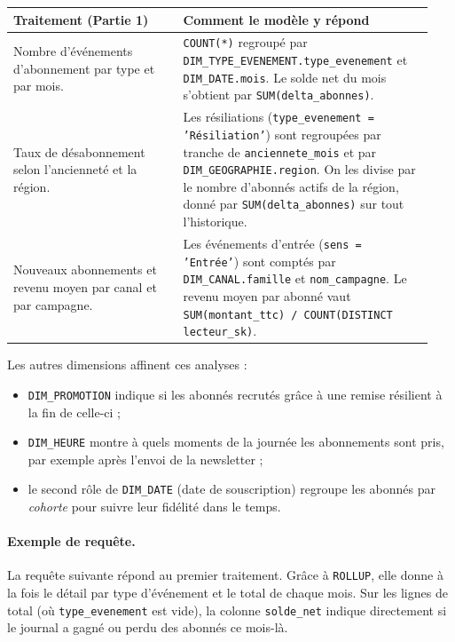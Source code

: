\documentclass[a4paper,12pt]{article}
\begin{document}
\begin{center}
\renewcommand{\arraystretch}{1.3}
\begin{tabular}{@{}p{0.38\linewidth}p{0.56\linewidth}@{}}
  \toprule
  \textbf{Traitement (Partie 1)} & \textbf{Comment le modèle y répond} \\
  \midrule
  Nombre d'événements d'abonnement par type et par mois.
    & \texttt{COUNT(*)} regroupé par \texttt{DIM\_TYPE\_EVENEMENT.type\_evenement}
      et \texttt{DIM\_DATE.mois}. Le solde net du mois s'obtient par
      \texttt{SUM(delta\_abonnes)}. \\
  \addlinespace
  Taux de désabonnement selon l'ancienneté et la région.
    & Les résiliations (\texttt{type\_evenement = 'Résiliation'}) sont
      regroupées par tranche de \texttt{anciennete\_mois} et par
      \texttt{DIM\_GEOGRAPHIE.region}. On les divise par le nombre d'abonnés
      actifs de la région, donné par \texttt{SUM(delta\_abonnes)} sur tout
      l'historique. \\
  \addlinespace
  Nouveaux abonnements et revenu moyen par canal et par campagne.
    & Les événements d'entrée (\texttt{sens = 'Entrée'}) sont comptés par
      \texttt{DIM\_CANAL.famille} et \texttt{nom\_campagne}. Le revenu moyen
      par abonné vaut \texttt{SUM(montant\_ttc) / COUNT(DISTINCT lecteur\_sk)}. \\
  \bottomrule
\end{tabular}
\end{center}

Les autres dimensions affinent ces analyses :
\begin{itemize}
  \item \texttt{DIM\_PROMOTION} indique si les abonnés recrutés grâce à une
        remise résilient à la fin de celle-ci ;
  \item \texttt{DIM\_HEURE} montre à quels moments de la journée les
        abonnements sont pris, par exemple après l'envoi de la newsletter ;
  \item le second rôle de \texttt{DIM\_DATE} (date de souscription)
        regroupe les abonnés par \emph{cohorte} pour suivre leur fidélité
        dans le temps.
\end{itemize}

\paragraph{Exemple de requête.}
La requête suivante répond au premier traitement. Grâce à \texttt{ROLLUP},
elle donne à la fois le détail par type d'événement et le total de chaque
mois. Sur les lignes de total (où \texttt{type\_evenement} est vide), la
colonne \texttt{solde\_net} indique directement si le journal a gagné
ou perdu des abonnés ce mois-là.
\end{document}
